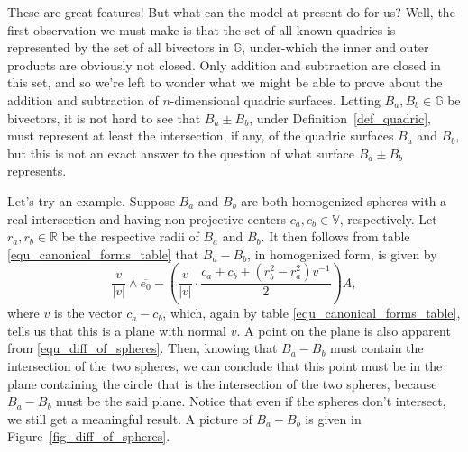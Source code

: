 \documentclass[12pt]{article}
\newcommand{\G}{\mathbb{G}}
\newcommand{\V}{\mathbb{V}}
\newcommand{\R}{\mathbb{R}}
\numberwithin{equation}{section}
\begin{document}
These are great features!  But what can the model at present do for us?  Well,
the first observation we must make is that the set of all known quadrics
is represented by the set of all bivectors in $\G$, under-which the inner
and outer products are obviously not closed.  Only addition and subtraction
are closed in this set, and so we're left to wonder what we might be able
to prove about the addition and subtraction of $n$-dimensional quadric surfaces.
Letting $B_a,B_b\in\G$ be bivectors, it is not hard to see that $B_a\pm B_b$, under
Definition~\ref{def_quadric}, must represent at least the intersection, if any,
of the quadric surfaces $B_a$ and $B_b$, but this is not an exact answer to the
question of what surface $B_a\pm B_b$ represents.

Let's try an example.  Suppose $B_a$ and $B_b$ are both homogenized spheres with
a real intersection and having
non-projective centers $c_a,c_b\in\V$, respectively.  Let $r_a,r_b\in\R$
be the respective radii of $B_a$ and $B_b$.  It then follows from
table \eqref{equ_canonical_forms_table} that $B_a-B_b$, in homogenized
form, is given by
\begin{equation}\label{equ_diff_of_spheres}
\frac{v}{|v|}\wedge\overline{e_0}-\left(\frac{v}{|v|}\cdot\frac{c_a+c_b+(r_b^2-r_a^2)v^{-1}}{2}\right)A,
\end{equation}
where $v$ is the vector $c_a-c_b$, which, again by table \eqref{equ_canonical_forms_table},
tells us that this is a plane with normal $v$.  A point on the plane is also apparent from
\eqref{equ_diff_of_spheres}.  Then, knowing that $B_a-B_b$ must contain the intersection of the
two spheres, we can conclude that this point must be in the plane containing the circle that is
the intersection of the two spheres, because $B_a-B_b$ must be the said plane.  Notice
that even if the spheres don't intersect, we still get a meaningful result.  A picture of
$B_a-B_b$ is given in Figure~\ref{fig_diff_of_spheres}.
\end{document}
